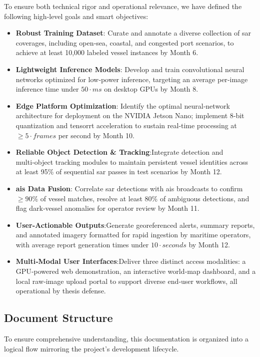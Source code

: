 \documentclass{article}
\begin{document}
To ensure both technical rigor and operational relevance, we have defined the following high‑level goals and \acrshort{smart} objectives:
\begin{itemize}
    \item \textbf{Robust Training Dataset}: Curate and annotate a diverse collection of \acrshort{sar} coverages, including open‑sea, coastal, and congested port scenarios, to achieve at least 10,000 labeled vessel instances by Month 6.
    \item \textbf{Lightweight Inference Models}: Develop and train convolutional neural networks optimized for low‑power inference, targeting an average per‑image inference time under $50\cdot ms$ on desktop GPUs by Month 8.
    \item \textbf{Edge Platform Optimization}: Identify the optimal neural‑network architecture for deployment on the NVIDIA Jetson Nano; implement 8‑bit quantization and \acrshort{tensorrt} acceleration to sustain real‑time processing at $\geq 5\cdot frames$ per second by Month 10.
    \item \textbf{Reliable Object Detection \& Tracking}:Integrate detection and multi‑object tracking modules to maintain persistent vessel identities across at least 95\% of sequential \acrshort{sar} passes in test scenarios by Month 12.
    \item \textbf{\acrshort{ais} Data Fusion}: Correlate \acrshort{sar} detections with \acrshort{ais} broadcasts to confirm $\geq90\%$ of vessel matches, resolve at least 80\% of ambiguous detections, and flag dark‑vessel anomalies for operator review by Month 11.
    \item \textbf{User‑Actionable Outputs}:Generate georeferenced alerts, summary reports, and annotated imagery formatted for rapid ingestion by maritime operators, with average report generation times under $10\cdot seconds$ by Month 12.
    \item \textbf{Multi‑Modal User Interfaces}:Deliver three distinct access modalities: a GPU‑powered web demonstration, an interactive world‑map dashboard, and a local raw‑image upload portal to support diverse end‑user workflows, all operational by thesis defense. \end{itemize}
\subsection{Document Structure}
To ensure comprehensive understanding, this documentation is organized into a logical flow mirroring the project's development lifecycle. \\
\end{document}
